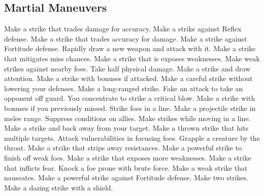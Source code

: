 \subsection{Martial Maneuvers}\label{Martial Maneuvers}
\begin{spelllist}
 Make a strike that trades damage for accuracy.
 Make a strike against Reflex defense.
 Make a strike that trades accuracy for damage.
 Make a strike against Fortitude defense.
 Rapidly draw a new weapon and attack with it.
 Make a strike that mitigates miss chances.
 Make a strike that is exposes weaknesses.
 Make weak strikes against nearby foes.
 Take half physical damage.
 Make a strike and draw attention.
 Make a strike with bonuses if attacked.
 Make a careful strike without lowering your defenses.
 Make a long-ranged strike.
 Fake an attack to take an opponent off guard.
 You concentrate to strike a critical blow.
 Make a strike with bonuses if you previously missed.
 Strike foes in a line.
 Make a projectile strike in melee range.
 Suppress conditions on allies.
 Make strikes while moving in a line.
 Make a strike and back away from your target.
 Make a thrown strike that hits multiple targets.
 Attack vulnerabilities in focusing foes.
 Grapple a creature by the throat.
 Make a strike that strips away resistances.
 Make a powerful strike to finish off weak foes.
 Make a strike that exposes more weaknesses.
 Make a strike that inflicts fear.
 Knock a foe prone with brute force.
 Make a weak strike that nauseates.
 Make a powerful strike against Fortitude defense.
 Make two strikes.
 Make a dazing strike with a shield.

\end{spelllist}
